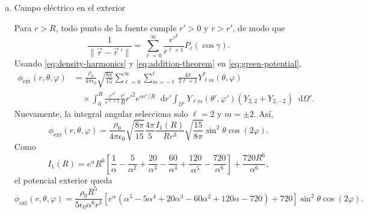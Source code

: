 \documentclass[a4paper]{article}
\newcommand{\dd}{\mathop{}\!\mathrm{d}}
\begin{document}
\begin{enumerate}[a)]
    
    \item Campo eléctrico en el exterior

\begin{center}
\end{center}

Para $r>R$, todo punto de la fuente cumple $r'>0$ y $r>r'$, de modo que
\[
\frac{1}{\lVert\vec r-\vec r\,'\rVert}
=\sum_{\ell=0}^{\infty}\frac{r'^\ell}{r^{\ell+1}}P_\ell(\cos\gamma).
\]
Usando \eqref{eq:density-harmonics} y \eqref{eq:addition-theorem} en \eqref{eq:green-potential},
\begin{align*}
\phi_{\mathrm{ext}}(r,\theta,\varphi)
&=\frac{\rho_0}{4\pi\epsilon_0}\sqrt{\frac{8\pi}{15}}
\sum_{\ell=0}^{\infty}\sum_{m=-\ell}^{\ell}\frac{4\pi}{2\ell+1}Y_{\ell m}^*(\theta,\varphi)\\
&\quad\times \int_0^R\frac{r'^\ell}{r^{\ell+1}}\frac{r'}{R}r'^2e^{\alpha r'/R}\dd r'
\int_{\Omega'}Y_{\ell m}(\theta',\varphi')\left(Y_{2,2}+Y_{2,-2}\right)\dd\Omega'.
\end{align*}
Nuevamente, la integral angular selecciona solo $\ell=2$ y $m=\pm2$. Así,
\[
\phi_{\mathrm{ext}}(r,\theta,\varphi)
=\frac{\rho_0}{4\pi\epsilon_0}\sqrt{\frac{8\pi}{15}}\frac{4\pi}{5}
\frac{I_1(R)}{Rr^3}\sqrt{\frac{15}{8\pi}}\sin^2\theta\cos(2\varphi).
\]
Como
\[
I_1(R)=e^\alpha R^6\left[\frac{1}{\alpha}-\frac{5}{\alpha^2}+\frac{20}{\alpha^3}
-\frac{60}{\alpha^4}+\frac{120}{\alpha^5}-\frac{720}{\alpha^6}\right]
+\frac{720R^6}{\alpha^6},
\]
el potencial exterior queda
\begin{equation}
\label{eq:phi-ext}
\boxed{
\phi_{\mathrm{ext}}(r,\theta,\varphi)
=\frac{\rho_0R^5}{5\epsilon_0\alpha^6r^3}
\left[e^\alpha(\alpha^5-5\alpha^4+20\alpha^3-60\alpha^2+120\alpha-720)+720\right]
\sin^2\theta\cos(2\varphi).}
\end{equation}


\end{enumerate}
\end{document}
